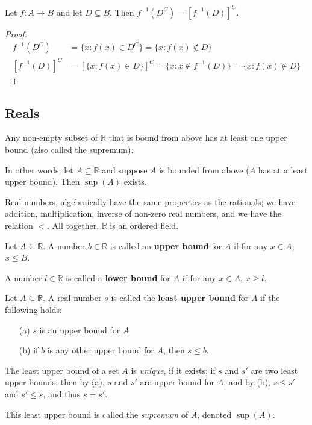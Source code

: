 \documentclass[12pt]{article}
\begin{document}
\begin{proposition}
  Let $f: A\to B$ and let $D \subseteq B$. Then $f^{-1} (D^C) = [f^{-1}(D)]^C$.
\end{proposition}
\begin{proof}[Proof]
  \begin{align*}
    f^{-1}(D^C) &= \{x: f(x) \in D^C\} = \{x : f(x) \notin D\}\\
    [f^{-1}(D)]^C &= [\{x:f(x) \in D\}]^C = \{x : x \notin f^{-1}(D)\} = \{x : f(x) \notin D\}
  \end{align*}
\end{proof}

\subsection{Reals}
\begin{axiom}[Of Completeness]\label{axiom:ac}
  Any non-empty subset of $\mathbb{R}$ that is bound from above has at least one upper bound (also called the supremum).

  In other words; let $A \subseteq \mathbb{R}$ and suppose $A$ is bounded from above ($A$ has at a least upper bound). Then $\sup(A)$ exists.
\end{axiom}

Real numbers, algebraically have the same properties as the rationals; we have addition, multiplication, inverse of non-zero real numbers, and we have the relation $<$. All together, $\mathbb{R}$ is an ordered field. 

\begin{definition}
  Let $A \subseteq \mathbb{R}$. A number $b \in \mathbb{R}$ is called an \textbf{upper bound} for $A$ if for any $x \in A$, $x \leq B$.

  A number $l \in \mathbb{R}$ is called a \textbf{lower bound} for $A$ if for any $x \in A$, $x \geq l$.
\end{definition}

\begin{definition}
  Let $A \subseteq \mathbb{R}$. A real number $s$ is called the \textbf{least upper bound} for $A$ if the following holds:
  \begin{itemize}
    \item[(a)] $s$ is an upper bound for $A$
    \item[(b)] if $b$ is any other upper bound for $A$, then $s \leq b$.
  \end{itemize}

  The least upper bound of a set $A$ is \emph{unique}, if it exists; if $s$ and $s'$ are two least upper bounds, then by (a), $s$ and $s'$ are upper bound for $A$, and by (b), $s \leq s'$ and $s' \leq s$, and thus $s = s'$.

  This least upper bound is called the \emph{supremum} of $A$, denoted $\sup(A)$.
\end{definition}
\end{document}
